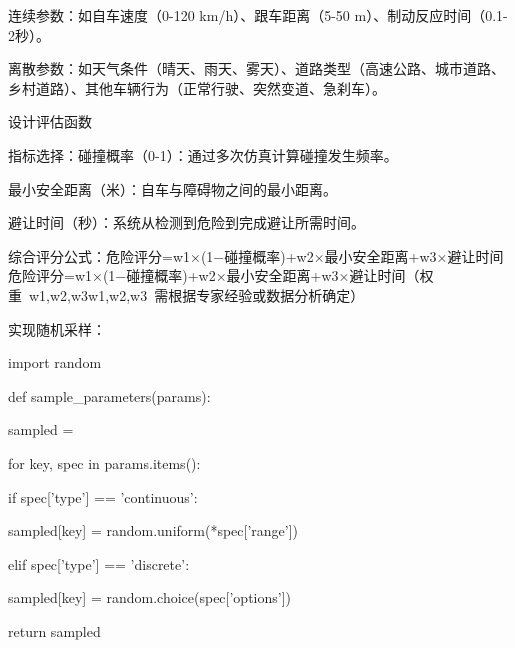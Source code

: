 连续参数：如自车速度（0-120 km/h）、跟车距离（5-50 m）、制动反应时间（0.1-2秒）。

离散参数：如天气条件（晴天、雨天、雾天）、道路类型（高速公路、城市道路、乡村道路）、其他车辆行为（正常行驶、突然变道、急刹车）。

设计评估函数


指标选择：碰撞概率（0-1）：通过多次仿真计算碰撞发生频率。

最小安全距离（米）：自车与障碍物之间的最小距离。

避让时间（秒）：系统从检测到危险到完成避让所需时间。

综合评分公式：危险评分=w1×(1−碰撞概率)+w2×最小安全距离+w3×避让时间危险评分=w1​×(1−碰撞概率)+w2​×最小安全距离+w3​×避让时间（权重 w1,w2,w3w1​,w2​,w3​ 需根据专家经验或数据分析确定）

实现随机采样：

import random

def sample\_parameters(params):

sampled = {}

for key, spec in params.items():

if spec['type'] == 'continuous':

sampled[key] = random.uniform(*spec['range'])

elif spec['type'] == 'discrete':

sampled[key] = random.choice(spec['options'])

return sampled

\newpage
